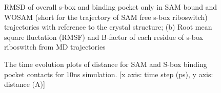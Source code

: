 \documentclass[a4paper,10pt]{article}
\begin{document}
\begin{figure}
    \newline
\caption{RMSD of overall s-box and binding pocket only in SAM bound and WOSAM (short for the 
trajectory of SAM free s-box riboswitch) trajectories  with reference to the crystal structure; (b) Root mean square fluctation (RMSF) and B-factor of each residue of s-box riboswitch from MD trajectories}
\end{figure}

\begin{figure}
\caption{The time evolution plots of distance for SAM and S-box binding pocket
contacts for 10ns simulation. [x axis: time step (ps), y axis: distance (A)]}
\end{figure}
\end{document}
